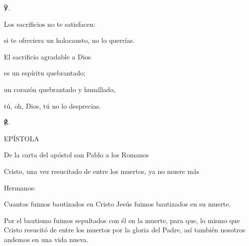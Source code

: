 			\begin{readbody}\begin{readred}℣.\end{readred} Los sacrificios no te satisfacen: \end{readbody}
			
			\begin{readtabbed}si te ofreciera un holocausto, no lo querrías. \end{readtabbed}
			
			\begin{readtabbed}El sacrificio agradable a Dios \end{readtabbed}
			
			\begin{readtabbed}es un espíritu quebrantado; \end{readtabbed}
			
			\begin{readtabbed}un corazón quebrantado y humillado, \end{readtabbed}
			
			\begin{readtabbed}tú, oh, Dios, tú no lo desprecias. \begin{readred}℟.\end{readred}\end{readtabbed}
			
			\begin{readtitle}EPÍSTOLA\end{readtitle}
			
			\begin{readbook}De la carta del apóstol san Pablo a los Romanos \end{readbook}
			
			\begin{readtheme}Cristo, una vez resucitado de entre los muertos, ya no muere más\end{readtheme}
			
			\begin{readbody}Hermanos: \end{readbody}
			
			\begin{readbody}Cuantos fuimos bautizados en Cristo Jesús fuimos bautizados en su muerte. \end{readbody}
			
			\begin{readbody}Por el bautismo fuimos sepultados con él en la muerte, para que, lo mismo que Cristo resucitó de entre los muertos por la gloria del Padre, así también nosotros andemos en una vida nueva. \end{readbody}
			
